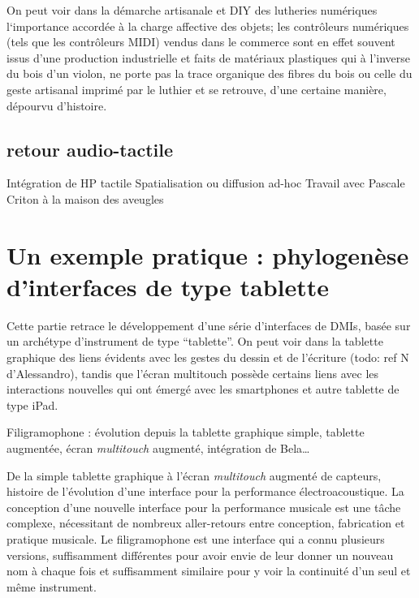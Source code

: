 \noindent On peut voir dans la démarche artisanale et \gls{DIY} des lutheries numériques l`importance accordée à la charge affective des objets; les contrôleurs numériques (tels que les contrôleurs \gls{MIDI}) vendus dans le commerce sont en effet souvent issus d'une production industrielle et faits de matériaux plastiques qui à l'inverse du bois d'un violon, ne porte pas la trace organique des fibres du bois ou celle du geste artisanal imprimé par le luthier et se retrouve, d'une certaine manière, dépourvu d'histoire.

\subsection{retour audio-tactile}
Intégration de HP tactile
Spatialisation ou diffusion ad-hoc
Travail avec Pascale Criton à la maison des aveugles


\section{Un exemple pratique : phylogenèse d'interfaces de type tablette}
\label{sec:interfaces:phylogenese}

\noindent Cette partie retrace le développement d'une série d'interfaces de \glspl{DMI}, basée sur un archétype d'instrument de type ``tablette''. On peut voir dans la tablette graphique des liens évidents avec les gestes du dessin et de l'écriture (todo: ref N d'Alessandro), tandis que l'écran multitouch possède certains liens avec les interactions nouvelles qui ont émergé avec les smartphones et autre tablette de type iPad.

Filigramophone : évolution depuis la tablette graphique simple, tablette augmentée, écran \textit{multitouch} augmenté, intégration de Bela…

De la simple tablette graphique à l’écran \textit{multitouch} augmenté de capteurs, histoire de l’évolution d’une interface pour la performance électroacoustique.
La conception d’une nouvelle interface pour la performance musicale est une tâche complexe, nécessitant de nombreux aller-retours entre conception, fabrication et pratique musicale. Le filigramophone est une interface qui a connu plusieurs versions, suffisamment différentes pour avoir envie de leur donner un nouveau nom à chaque fois et suffisamment similaire pour y voir la continuité d’un seul et même instrument.

